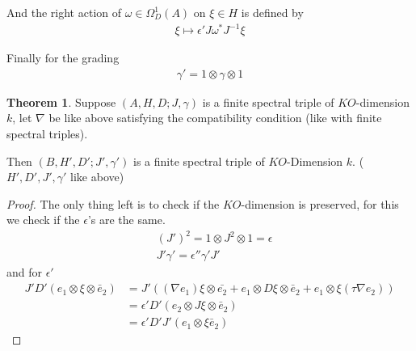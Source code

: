 \documentclass[a4paper]{article}
\theoremstyle{definition}
\theoremstyle{definition}
\theoremstyle{definition}
\theoremstyle{theorem}
\newtheorem{theorem}{Theorem}
\theoremstyle{theorem}
\begin{document}
And the right action of $\omega \in \Omega _D ^1(A)$ on $\xi \in H$ is
defined by
\begin{align}
    \xi \mapsto \epsilon' J \omega ^* J^{-1}\xi
\end{align}

Finally for the grading
\begin{align}
    \gamma ' = 1 \otimes \gamma \otimes 1
\end{align}

\begin{theorem}
    Suppose $(A, H, D; J, \gamma)$ is a finite spectral triple of
    $KO$-dimension $k$, let $\nabla$ be like above satisfying the
    compatibility condition (like with finite spectral triples).

    Then $(B, H',D'; J', \gamma')$ is a finite spectral triple of
    $KO$-Dimension $k$. ($H', D', J', \gamma'$ like above)
\end{theorem}

\begin{proof}
    The only thing left is to check if the $KO$-dimension is preserved,
    for this we check if the $\epsilon$'s are the same.
    \begin{align*}
        &(J')^2 = 1 \otimes J^2 \otimes 1 = \epsilon\\
        &J' \gamma '= \epsilon ''\gamma'J'
    \end{align*}
    and for $\epsilon '$
    \begin{align*}
        J'D'(e_1 \otimes \xi \otimes \bar{e}_2)&=J'((\nabla e_1) \xi \otimes
        \bar{e_2} + e_1 \otimes D\xi \otimes \bar{e}_2 + e_1 \otimes \xi (\tau
        \nabla e_2))\\
        &= \epsilon' D'(e_2 \otimes J\xi \otimes \bar{e}_2)\\
        &= \epsilon' D'J'(e_1 \otimes \xi \bar{e}_2)
    \end{align*}
\end{proof}
\end{document}
